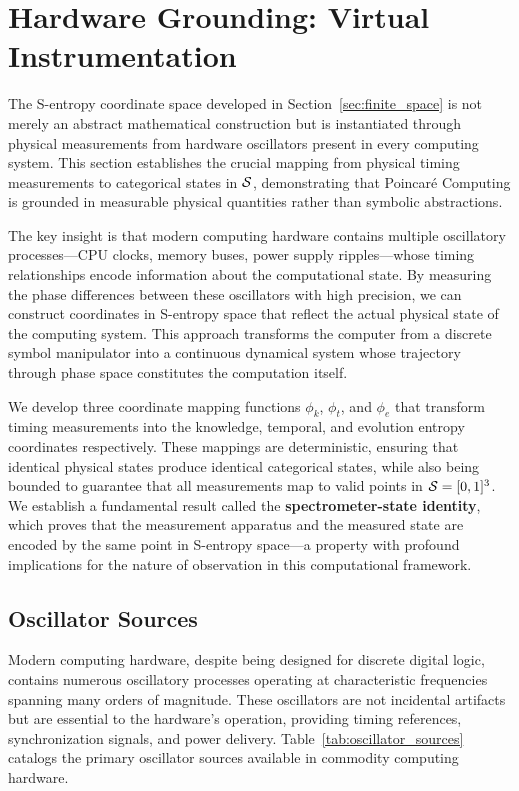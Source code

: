 \section{Hardware Grounding: Virtual Instrumentation}
\label{sec:virtual_instrument}

The S-entropy coordinate space developed in Section~\ref{sec:finite_space} is not merely an abstract mathematical construction but is instantiated through physical measurements from hardware oscillators present in every computing system. This section establishes the crucial mapping from physical timing measurements to categorical states in $\mathcal{S}$, demonstrating that Poincaré Computing is grounded in measurable physical quantities rather than symbolic abstractions.

The key insight is that modern computing hardware contains multiple oscillatory processes---CPU clocks, memory buses, power supply ripples---whose timing relationships encode information about the computational state. By measuring the phase differences between these oscillators with high precision, we can construct coordinates in S-entropy space that reflect the actual physical state of the computing system. This approach transforms the computer from a discrete symbol manipulator into a continuous dynamical system whose trajectory through phase space constitutes the computation itself.

We develop three coordinate mapping functions $\phi_k$, $\phi_t$, and $\phi_e$ that transform timing measurements into the knowledge, temporal, and evolution entropy coordinates respectively. These mappings are deterministic, ensuring that identical physical states produce identical categorical states, while also being bounded to guarantee that all measurements map to valid points in $\mathcal{S} = [0,1]^3$. We establish a fundamental result called the \textbf{spectrometer-state identity}, which proves that the measurement apparatus and the measured state are encoded by the same point in S-entropy space---a property with profound implications for the nature of observation in this computational framework.



\subsection{Oscillator Sources}

Modern computing hardware, despite being designed for discrete digital logic, contains numerous oscillatory processes operating at characteristic frequencies spanning many orders of magnitude. These oscillators are not incidental artifacts but are essential to the hardware's operation, providing timing references, synchronization signals, and power delivery. Table~\ref{tab:oscillator_sources} catalogs the primary oscillator sources available in commodity computing hardware.

